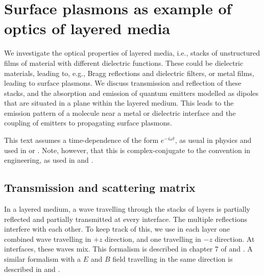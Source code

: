 


\chapter{Surface plasmons as example of optics of layered media}

\label{chap:tmatrix}

We investigate the optical properties of layered media, i.e., stacks of unstructured   films of material with different dielectric functions. These could be dielectric materials, leading to, e.g., Bragg reflections and dielectric filters, or metal films, leading to surface plasmons. We discuss transmission and reflection of these stacks, and the absorption and emission of quantum emitters modelled as dipoles that are situated in a plane within the layered medium. This leads to the emission pattern of a molecule near a metal or dielectric interface and the coupling of emitters to propagating surface plasmons.

This text assumes a time-dependence of the form $e^{-i \omega t}$, as usual in physics and used in \cite{Novotny-Hecht2012} or \cite{BornWolf2002}. Note, however, that this is complex-conjugate to the convention in engineering, as used in \cite{SalehTeich_2ed} and \cite{Yeh2005}.


\section{Transmission and scattering matrix}


In a layered medium, a wave travelling through the stacks of layers is  partially reflected and partially transmitted at every interface. The multiple reflections interfere with each other. To keep track of this, we use in each layer one combined wave travelling in $+z$ direction, and one travelling in $-z$ direction. At interfaces, these waves mix. This formalism is described in  chapter 7 of \cite{SalehTeich_2ed} and \cite{Yeh2005}. A similar formalism with a $E$ and $B$ field travelling in the same direction is described in \cite{Pedrotti2008} and \cite{Macleod2001}.

